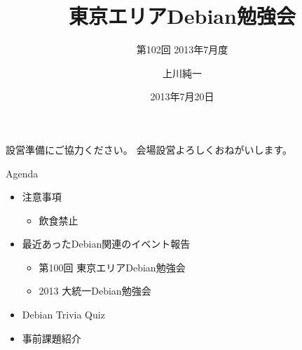 \title{東京エリアDebian勉強会}
\subtitle{第102回 2013年7月度}
\author{上川純一}
\date{2013年7月20日}



\begin{frame}
\titlepage{}
\end{frame}

\begin{frame}{設営準備にご協力ください。}
会場設営よろしくおねがいします。
\end{frame}

\begin{frame}{Agenda}
\begin{minipage}[t]{0.45\hsize}
  \begin{itemize}
  \item 注意事項
	\begin{itemize}
	 \item 飲食禁止
	\end{itemize}
   \item 最近あったDebian関連のイベント報告
	\begin{itemize}
        \item 第100回 東京エリアDebian勉強会
        \item 2013 大統一Debian勉強会
	\end{itemize}
 \end{itemize}
\end{minipage} 
\begin{minipage}[t]{0.45\hsize}
 \begin{itemize}
  \item Debian Trivia Quiz
  \item 事前課題紹介
 \end{itemize}
\end{minipage}
\end{frame}


